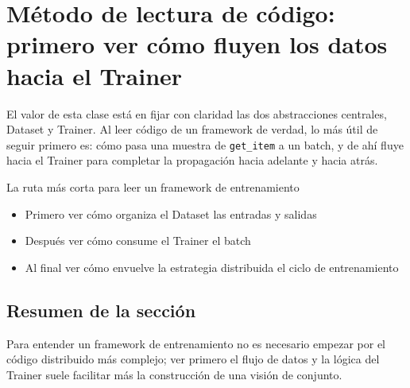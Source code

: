 \section{Método de lectura de código: primero ver cómo fluyen los datos hacia el Trainer}
El valor de esta clase está en fijar con claridad las dos abstracciones centrales, Dataset y Trainer. Al leer código de un framework de verdad, lo más útil de seguir primero es: cómo pasa una muestra de \texttt{get\_item} a un batch, y de ahí fluye hacia el Trainer para completar la propagación hacia adelante y hacia atrás.

\begin{knowledgebox}{La ruta más corta para leer un framework de entrenamiento}
\begin{itemize}
  \item Primero ver cómo organiza el Dataset las entradas y salidas
  \item Después ver cómo consume el Trainer el batch
  \item Al final ver cómo envuelve la estrategia distribuida el ciclo de entrenamiento
\end{itemize}
\end{knowledgebox}

\subsection{Resumen de la sección}
Para entender un framework de entrenamiento no es necesario empezar por el código distribuido más complejo; ver primero el flujo de datos y la lógica del Trainer suele facilitar más la construcción de una visión de conjunto.

\newpage
